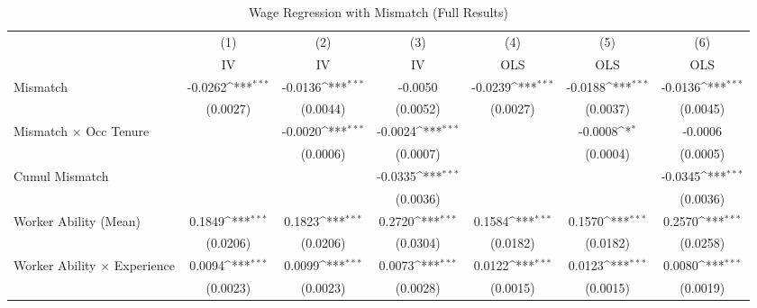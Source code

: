 {
\def\sym#1{\ifmmode^{#1}\else\(^{#1}\)\fi}
\begin{longtable}{l*{6}{c}}
\caption{Wage Regression with Mismatch (Full Results)}\\
\hline  \endfirsthead\hline  \endhead\hline  \endfoot\endlastfoot
                    &\multicolumn{1}{c}{(1)}&\multicolumn{1}{c}{(2)}&\multicolumn{1}{c}{(3)}&\multicolumn{1}{c}{(4)}&\multicolumn{1}{c}{(5)}&\multicolumn{1}{c}{(6)}\\
                    &\multicolumn{1}{c}{IV}&\multicolumn{1}{c}{IV}&\multicolumn{1}{c}{IV}&\multicolumn{1}{c}{OLS}&\multicolumn{1}{c}{OLS}&\multicolumn{1}{c}{OLS}\\
\hline  
Mismatch            &     -0.0262\sym{***}&     -0.0136\sym{***}&     -0.0050         &     -0.0239\sym{***}&     -0.0188\sym{***}&     -0.0136\sym{***}\\
                    &    (0.0027)         &    (0.0044)         &    (0.0052)         &    (0.0027)         &    (0.0037)         &    (0.0045)         \\
Mismatch $\times$ Occ Tenure&                     &     -0.0020\sym{***}&     -0.0024\sym{***}&                     &     -0.0008\sym{*}  &     -0.0006         \\
                    &                     &    (0.0006)         &    (0.0007)         &                     &    (0.0004)         &    (0.0005)         \\
Cumul Mismatch      &                     &                     &     -0.0335\sym{***}&                     &                     &     -0.0345\sym{***}\\
                    &                     &                     &    (0.0036)         &                     &                     &    (0.0036)         \\
Worker Ability (Mean)&      0.1849\sym{***}&      0.1823\sym{***}&      0.2720\sym{***}&      0.1584\sym{***}&      0.1570\sym{***}&      0.2570\sym{***}\\
                    &    (0.0206)         &    (0.0206)         &    (0.0304)         &    (0.0182)         &    (0.0182)         &    (0.0258)         \\
Worker Ability $\times$ Experience&      0.0094\sym{***}&      0.0099\sym{***}&      0.0073\sym{***}&      0.0122\sym{***}&      0.0123\sym{***}&      0.0080\sym{***}\\
                    &    (0.0023)         &    (0.0023)         &    (0.0028)         &    (0.0015)         &    (0.0015)         &    (0.0019)         \\

\end{longtable}}
